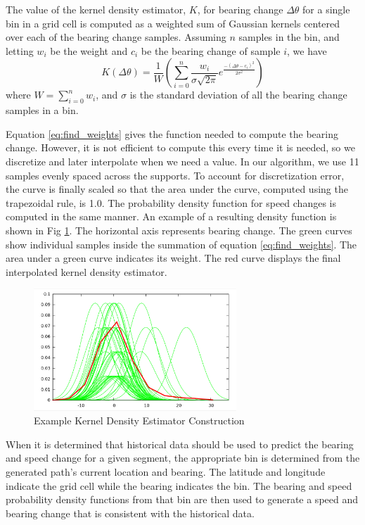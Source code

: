 \documentclass[journal]{vgtc}                %
\begin{document}
The value of the kernel density estimator, $K$, for bearing change $\Delta\theta$ for a single bin in a grid cell 
 is computed as a weighted sum of Gaussian kernels centered over each of the bearing change samples.
 Assuming $n$ samples in the bin, and letting $w_i$ be the weight and $c_i$ be the bearing change of sample $i$,
 we have
\begin{equation}
 K(\Delta\theta) = \frac{1}{W}(\sum_{i=0}^{n} \frac{w_i}{\sigma \sqrt{2\pi}} e^{\frac{-(\Delta\theta-c_i)^2}{2\sigma^2}})
 \label{eq:find_weights}
\end{equation}
where $W = \sum_{i=0}^n w_i$, and $\sigma$ is the standard deviation of all the bearing change samples in a bin. 

Equation \ref{eq:find_weights} gives the function needed to compute the bearing change.  However, it is not efficient to compute this every time it is needed, so we discretize and later interpolate when we need a value. 
 In our algorithm, we use 11 samples 
evenly spaced across the supports. To account for discretization error, the curve is finally scaled so that the
area under the curve, computed using the trapezoidal rule, is 1.0. The probability density function for speed changes is computed in the same manner.  
An example of a resulting density function is shown in Fig \ref{fig:kde}. The horizontal axis represents bearing change. The green curves show individual samples inside the summation of equation \ref{eq:find_weights}.  The area under a green curve indicates its weight. The red curve displays the final interpolated kernel density estimator.   

\begin{figure}[htb]
 \centering
 \includegraphics[width=3.0in]{figures/kde.eps}
 \caption{Example Kernel Density Estimator Construction}
 \label{fig:kde}
\end{figure}

When it is determined that historical data should be used to predict the bearing and speed change for a given segment, the appropriate bin is determined from the generated path's current location and bearing.  The latitude and longitude indicate the grid cell while the bearing indicates the bin.  The bearing and speed probability density functions from that bin are then used to generate a speed and bearing change that is consistent with the historical data.  
\end{document}
